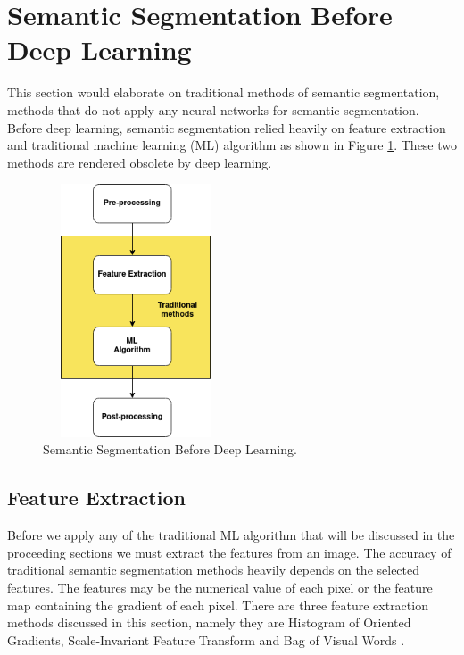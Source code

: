 \section{Semantic Segmentation Before Deep Learning}

This section would elaborate on traditional methods of semantic segmentation, methods that do not apply any neural networks for semantic segmentation. Before deep learning, semantic segmentation relied heavily on feature extraction and traditional machine learning (ML) algorithm as shown in Figure \ref{fig:trad}. These two methods are rendered obsolete by deep learning.

\FloatBarrier
\begin{figure}[ht]
\includegraphics[width=5.5cm, height=7.5cm]{images/traditional.png}
\centering
\caption{Semantic Segmentation Before Deep Learning.}
\label{fig:trad}
\end{figure}
\FloatBarrier


\subsection{Feature Extraction}
Before we apply any of the traditional ML algorithm that will be discussed in the proceeding sections  we must extract the features from an image. The accuracy of traditional semantic segmentation methods heavily depends on the selected features. The features may be the numerical value of each pixel or the feature map containing the gradient of each pixel. There are three feature extraction methods discussed in this section, namely they are Histogram of Oriented Gradients, Scale-Invariant Feature Transform and Bag of Visual Words .

